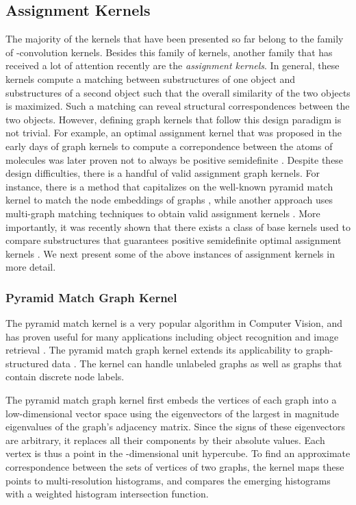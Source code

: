 \documentclass[twoside,11pt]{article}
\begin{document}
\subsection{Assignment Kernels}
The majority of the kernels that have been presented so far belong to the family of -convolution kernels.
Besides this family of kernels, another family that has received a lot of attention recently are the \textit{assignment kernels}.
In general, these kernels compute a matching between substructures of one object and substructures of a second object such that the overall similarity of the two objects is maximized.
Such a matching can reveal structural correspondences between the two objects.
However, defining graph kernels that follow this design paradigm is not trivial.
For example, an optimal assignment kernel that was proposed in the early days of graph kernels to compute a correpondence between the atoms of molecules \cite{frohlich2005optimal} was later proven not to always be positive semidefinite \cite{vert2008optimal}.
Despite these design difficulties, there is a handful of valid assignment graph kernels.
For instance, there is a method that capitalizes on the well-known pyramid match kernel to match the node embeddings of graphs \cite{nikolentzos2017matching}, while another approach uses multi-graph matching techniques to obtain valid assignment kernels \cite{schiavinato2015transitive}.
More importantly, it was recently shown that there exists a class of base kernels used to compare substructures that guarantees positive semidefinite optimal assignment kernels \cite{kriege2016valid}.
We next present some of the above instances of assignment kernels in more detail.

\subsubsection{Pyramid Match Graph Kernel}
The pyramid match kernel is a very popular algorithm in Computer Vision, and has proven useful for many applications including object recognition and image retrieval \cite{grauman2007pyramid,lazebnik2006beyond}.
The pyramid match graph kernel extends its applicability to graph-structured data \cite{nikolentzos2017matching}.
The kernel can handle unlabeled graphs as well as graphs that contain discrete node labels.

The pyramid match graph kernel first embeds the vertices of each graph into a low-dimensional vector space using the eigenvectors of the  largest in magnitude eigenvalues of the graph's adjacency matrix.
Since the signs of these eigenvectors are arbitrary, it replaces all their components by their absolute values.
Each vertex is thus a point in the -dimensional unit hypercube.
To find an approximate correspondence between the sets of vertices of two graphs, the kernel maps these points to multi-resolution histograms, and compares the emerging histograms with a weighted histogram intersection function.
\end{document}
